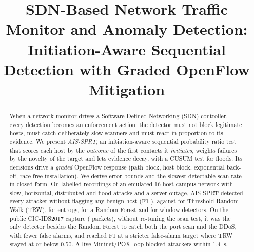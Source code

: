 \documentclass[conference]{IEEEtran}
\begin{document}
\title{SDN-Based Network Traffic Monitor and Anomaly Detection:\\ Initiation-Aware Sequential Detection with Graded OpenFlow Mitigation}

\author{
\and
{}
\and
{}
\and
{}
\and
{}
\and
{}
\and
{}
}

\maketitle

\begin{abstract}
When a network monitor drives a Software-Defined Networking (SDN) controller, every detection becomes an enforcement
action: the detector must not block legitimate hosts, must catch deliberately slow scanners and must react in proportion
to its evidence. We present \emph{AIS-SPRT}, an initiation-aware sequential probability ratio test that scores each host by
the \emph{outcome} of the first contacts it \emph{initiates}, weights failures by the novelty of the target and lets evidence
decay, with a CUSUM test for floods. Its decisions drive a \emph{graded} OpenFlow response (path block, host block,
exponential back-off, race-free installation). We derive error bounds and the slowest detectable scan rate in closed form.
On \NRuns{} labelled recordings of an emulated 16-host campus network with slow, horizontal, distributed and flood attacks
and a server outage, AIS-SPRT detected every attacker without flagging any benign host (F1 \OursFone{}), against
\TRWFone{} for Threshold Random Walk (TRW), \EntFone{} for entropy, \RFFone{} for a Random Forest and \IAFone{} for window
detectors. On the public CIC-IDS2017 capture (\cicPackets{} packets), without re-tuning the scan test, it was the only
detector besides the Random Forest to catch both the port scan and the DDoS, with fewer false alarms, and reached F1
\swCicBFone{} at a stricter false-alarm target where TRW stayed at or below 0.50. A live Mininet/POX loop blocked
attackers within 1.4~s.
\end{abstract}
\end{document}
